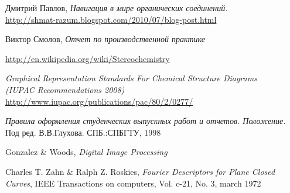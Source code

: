 \begin{thebibliography}{9}

  Дмитрий Павлов,
  \emph{Навигация в мире органических соединений}.\\
  \url{http://shmat-razum.blogspot.com/2010/07/blog-post.html}

  Виктор Смолов,
  \emph{Отчет по производственной практике}

  \url{http://en.wikipedia.org/wiki/Stereochemistry}

  \emph{Graphical Representation Standards For Chemical Structure Diagrams \\ (IUPAC Recommendations 2008)} \\
  \url{http://www.iupac.org/publications/pac/80/2/0277/}

  \emph{Правила оформления студенческих выпускных работ и отчетов. Положение.} 
  Под ред. В.В.Глухова.
  СПБ.:СПБГТУ, 1998

  Gonzalez \& Woods,
  \emph{Digital Image Processing}

  Charles T. Zahn \& Ralph Z. Roskies,
  \emph{Fourier Descriptors for Plane Closed Curves},
   IEEE Transactions on computers, Vol. c-21, No. 3, march 1972

\end{thebibliography}



